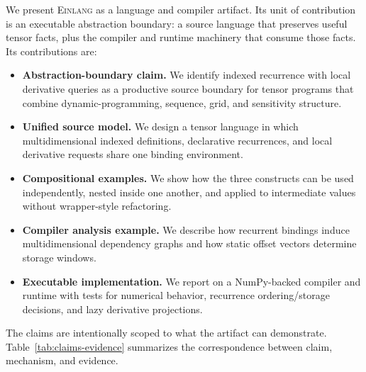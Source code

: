 \documentclass[sigplan,screen,nonacm]{acmart}
\newcommand{\einlang}{\textsc{Einlang}}
\begin{document}
We present \einlang{} as a language and compiler artifact. Its unit of contribution is an executable abstraction boundary: a source language that preserves useful tensor facts, plus the compiler and runtime machinery that consume those facts. Its contributions are:
\begin{itemize}
\item \textbf{Abstraction-boundary claim.} We identify indexed recurrence with local derivative queries as a productive source boundary for tensor programs that combine dynamic-programming, sequence, grid, and sensitivity structure.
\item \textbf{Unified source model.} We design a tensor language in which multidimensional indexed definitions, declarative recurrences, and local derivative requests share one binding environment.
\item \textbf{Compositional examples.} We show how the three constructs can be used independently, nested inside one another, and applied to intermediate values without wrapper-style refactoring.
\item \textbf{Compiler analysis example.} We describe how recurrent bindings induce multidimensional dependency graphs and how static offset vectors determine storage windows.
\item \textbf{Executable implementation.} We report on a NumPy-backed compiler and runtime with tests for numerical behavior, recurrence ordering/storage decisions, and lazy derivative projections.
\end{itemize}

The claims are intentionally scoped to what the artifact can demonstrate. Table~\ref{tab:claims-evidence} summarizes the correspondence between claim, mechanism, and evidence.
\end{document}
